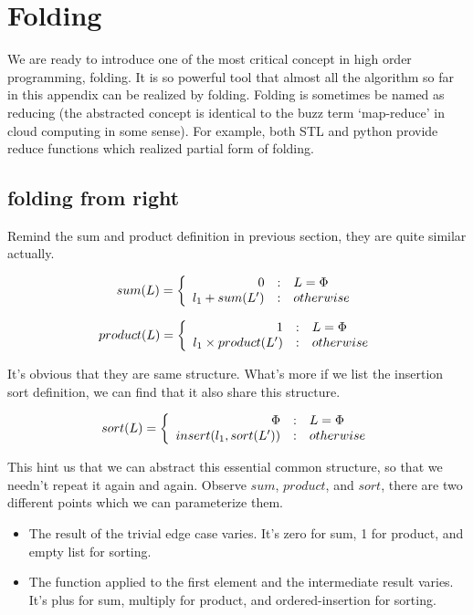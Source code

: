 \documentclass{article}
\begin{document}
\section{Folding}

We are ready to introduce one of the most critical concept in high order programming, folding. It is so powerful tool
that almost all the algorithm so far in this appendix can be realized by folding. Folding is sometimes be named as
reducing (the abstracted concept is identical to the buzz term `map-reduce' in cloud computing in some sense). For example,
both STL and python provide reduce functions which realized partial form of folding.

\subsection{folding from right}
Remind the sum and product definition in previous section, they are quite similar actually.

\[
sum(L) =  \left \{
  \begin{array}
  {r@{\quad:\quad}l}
  0 & L = \Phi \\
  l_1 + sum(L') & otherwise
  \end{array}
\right.
\]

\[
product(L) = \left \{
  \begin{array}
  {r@{\quad:\quad}l}
  1 & L = \Phi \\
  l_1 \times product(L') & otherwise
  \end{array}
\right.
\]

It's obvious that they are same structure. What's more if we list the insertion sort definition, we can
find that it also share this structure.

\[
sort(L) = \left \{
  \begin{array}
  {r@{\quad:\quad}l}
  \Phi & L = \Phi \\
  insert(l_1, sort(L')) & otherwise
  \end{array}
\right.
\]

This hint us that we can abstract this essential common structure, so that we needn't repeat it again and again.
Observe $sum$, $product$, and $sort$, there are two different points which we can parameterize them.

\begin{itemize}
\item The result of the trivial edge case varies. It's zero for sum, 1 for product, and empty list for sorting.
\item The function applied to the first element and the intermediate result varies. It's plus for sum, multiply for product,
and ordered-insertion for sorting.
\end{itemize}
\end{document}

